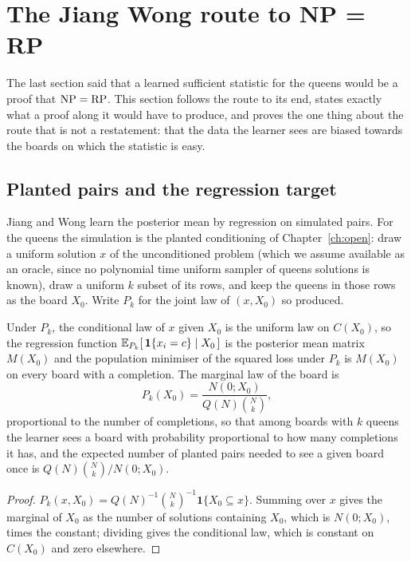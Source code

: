 \section{The Jiang Wong route to NP = RP}
\label{sec:jwroute}

The last section said that a learned sufficient statistic for the queens would be a proof that $\mathrm{NP} = \mathrm{RP}$. This section follows the route to its end, states exactly what a proof along it would have to produce, and proves the one thing about the route that is not a restatement: that the data the learner sees are biased towards the boards on which the statistic is easy.

\subsection*{Planted pairs and the regression target}

Jiang and Wong learn the posterior mean by regression on simulated pairs. For the queens the simulation is the planted conditioning of Chapter~\ref{ch:open}: draw a uniform solution $x$ of the unconditioned problem (which we assume available as an oracle, since no polynomial time uniform sampler of queens solutions is known), draw a uniform $k$ subset of its rows, and keep the queens in those rows as the board $X_0$. Write $P_k$ for the joint law of $(x, X_0)$ so produced.

\begin{theorem}
\label{thm:planted}
Under $P_k$, the conditional law of $x$ given $X_0$ is the uniform law on $C(X_0)$, so the regression function $\mathbb{E}_{P_k}[\, \mathbf 1\{x_i = c\} \mid X_0 \,]$ is the posterior mean matrix $M(X_0)$ and the population minimiser of the squared loss under $P_k$ is $M(X_0)$ on every board with a completion. The marginal law of the board is
\[
P_k(X_0) = \frac{ N(0; X_0) }{ Q(N) \binom{N}{k} } ,
\]
proportional to the number of completions, so that among boards with $k$ queens the learner sees a board with probability proportional to how many completions it has, and the expected number of planted pairs needed to see a given board once is $Q(N) \binom{N}{k} / N(0; X_0)$.
\end{theorem}

\begin{proof}
$P_k(x, X_0) = Q(N)^{-1} \binom{N}{k}^{-1} \mathbf 1\{ X_0 \subseteq x \}$. Summing over $x$ gives the marginal of $X_0$ as the number of solutions containing $X_0$, which is $N(0; X_0)$, times the constant; dividing gives the conditional law, which is constant on $C(X_0)$ and zero elsewhere.
\end{proof}

